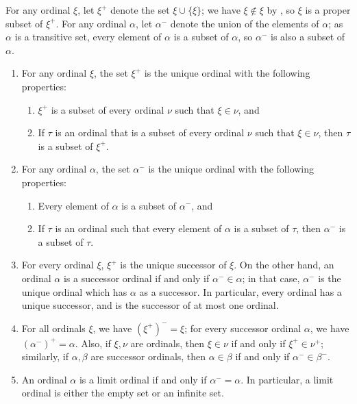 \documentclass{article}
\begin{document}
For any ordinal \(\xi\), let \(\xi^+\) denote the set
\(\xi \cup \{ \xi \}\); we have \(\xi \notin \xi\) by
, so \(\xi\) is a proper subset of \(\xi^+\).  For
any ordinal \(\alpha\), let \(\alpha^-\) denote the union of the
elements of \(\alpha\); as \(\alpha\) is a transitive set, every
element of \(\alpha\) is a subset of \(\alpha\), so \(\alpha^-\) is
also a subset of \(\alpha\).

\begin{theorem}
  \label{thm:8odofa55}
  \begin{enumerate}
  \item For any ordinal \(\xi\), the set \(\xi^+\) is the unique
    ordinal with the following properties:
    \begin{enumerate}
    \item \(\xi^+\) is a subset of every ordinal \(\nu\) such that
      \(\xi \in \nu\), and
    \item If \(\tau\) is an ordinal that is a subset of every ordinal
      \(\nu\) such that \(\xi \in \nu\), then \(\tau\) is a subset of
      \(\xi^+\).
    \end{enumerate}
  \item For any ordinal \(\alpha\), the set \(\alpha^-\) is the unique
    ordinal with the following properties:
    \begin{enumerate}
    \item Every element of \(\alpha\) is a subset of \(\alpha^-\), and
    \item If \(\tau\) is an ordinal such that every element of
      \(\alpha\) is a subset of \(\tau\), then \(\alpha^-\) is a
      subset of \(\tau\).
    \end{enumerate}
  \item For every ordinal \(\xi\), \(\xi^+\) is the unique successor
    of \(\xi\).  On the other hand, an ordinal \(\alpha\) is a
    successor ordinal if and only if \(\alpha^- \in \alpha\); in that
    case, \(\alpha^-\) is the unique ordinal which has \(\alpha\) as a
    successor. In particular, every ordinal has a unique successor,
    and is the successor of at most one ordinal.
  \item For all ordinals \(\xi\), we have \((\xi^+)^- = \xi\); for
    every successor ordinal \(\alpha\), we have
    \((\alpha^-)^+ = \alpha\).  Also, if \(\xi, \nu\) are ordinals,
    then \(\xi \in \nu\) if and only if \(\xi^+ \in \nu^+\);
    similarly, if \(\alpha, \beta\) are successor ordinals, then
    \(\alpha \in \beta\) if and only if \(\alpha^- \in \beta^-\).
  \item An ordinal \(\alpha\) is a limit ordinal if and only if
    \(\alpha^- = \alpha\).  In particular, a limit ordinal is either
    the empty set or an infinite set.
  \end{enumerate}
\end{theorem}
\end{document}
